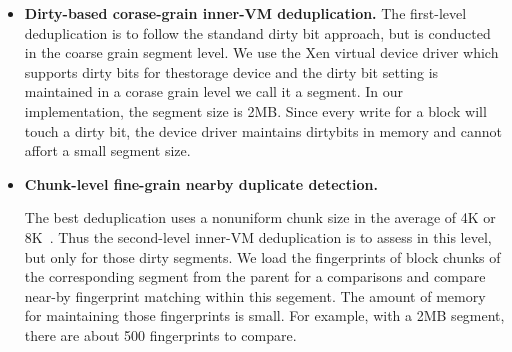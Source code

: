 \begin{itemize}
\item \textbf{Dirty-based corase-grain inner-VM deduplication.}
The first-level deduplication is to follow the standand dirty bit approach, but is conducted
in the coarse grain segment level.
We use the  Xen virtual device driver which supports dirty bits for thestorage device
and the dirty bit setting is maintained in a corase grain level we call it a segment.
In our implementation, the segment size is 2MB. 
Since every write for a block will touch a dirty bit, the device driver maintains dirtybits in memory
and cannot affort a small segment  size.

\item \textbf{Chunk-level fine-grain nearby duplicate detection.}

The best deduplication uses a nonuniform chunk size 
in the average of 4K or 8K~\cite{??}.
Thus the second-level inner-VM deduplication is to assess in this
level, but only for those dirty  segments. 
We load the fingerprints of block chunks of the corresponding segment from the
parent for a comparisons and compare near-by fingerprint matching within this segement.
The amount of memory for maintaining those fingerprints  is small.
For example, with a 2MB segment, there are about 500 fingerprints to compare.


%

%


\end{itemize}

